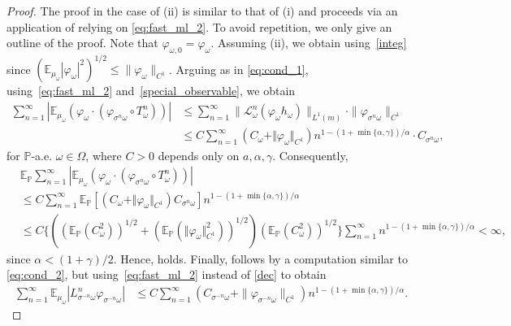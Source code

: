 \documentclass[12pt,reqno,a4paper]{article}
\newcommand\bP{{\mathbb P}}
\begin{document}
\begin{proof}
		The proof in the case of (ii) is similar to that of (i) and proceeds via an application of \cite[Theorem 2.3]{K} relying on \eqref{eq:fast_ml_2}. 
		To avoid repetition, we only give an outline of the proof. Note that $\varphi_{\omega, 0}=\varphi_\omega$.
		Assuming (ii), we obtain \cite[(2.7)]{K} using~\eqref{integ} since $(\mathbb E_{\mu_\omega}|\varphi_{\omega}|^2)^{1/2}\le \|\varphi_\omega\|_{C^1}$. Arguing as in \eqref{eq:cond_1}, using~\eqref{eq:fast_ml_2} and~\eqref{special_observable}, we obtain
		\[
		\begin{split}
			\sum_{n=1}^\infty \left |\mathbb E_{\mu_\omega}(\varphi_{\omega} \cdot (\varphi_{\sigma^n \omega}\circ T_\omega^n))\right | 
			&\le \sum_{n=1}^\infty \|\mathcal L_\omega^n (\varphi_{\omega} h_\omega)\|_{L^1(m)} \cdot \|\varphi_{\sigma^n \omega}\|_{C^1} \\
			&\le C \sum_{n=1}^\infty ( C_\omega + \Vert \varphi_\omega \Vert_{C^1}  ) n^{ 1 - (1 +  \min\{\alpha, \gamma \} )/\alpha}
			\cdot C_{\sigma^n \omega},
		\end{split}
		\]
		for $\bP$-a.e. $\omega \in \Omega$, where $C > 0$ 
		depends only on $a, \alpha, \gamma$. Consequently,
		\[
		\begin{split}
			&\mathbb E_{\mathbb P}\sum_{n=1}^\infty \left |\mathbb E_{\mu_\omega}(\varphi_{\omega} \cdot (\varphi_{\sigma^n \omega}\circ T_\omega^n))\right | \\
			&\le 
			C
			\sum_{n=1}^\infty 
			\mathbb E_{\mathbb P} [ ( C_\omega + \Vert \varphi_\omega \Vert_{C^1}  )   C_{\sigma^n \omega} ]
			 n^{ 1 - (1 +  \min\{\alpha, \gamma \} )/\alpha}  \\
			&\le 
			C\biggl\{  (  ( \mathbb E_{\mathbb P} ( C_{ \omega}^2 ))^{1/2}  
			+  ( \mathbb E_{\mathbb P} (  \Vert \varphi_\omega \Vert_{C^1}^2 ) )^{1/2}  ) ( \mathbb E_{\mathbb P} ( C_{ \omega}^2 ))^{1/2}  \biggr\} 
			\sum_{n=1}^\infty  n^{ 1 - (1 +  \min\{\alpha, \gamma \} )/\alpha} < \infty,
		\end{split}
		\]
		since $\alpha < (1 + \gamma) / 2$. Hence, \cite[Theorem 2.3 (i)]{K} holds.
		Finally, \cite[Theorem 2.3 (ii')]{K} follows by a computation similar to \eqref{eq:cond_2}, but using~\eqref{eq:fast_ml_2} instead of \eqref{dec} to obtain
		\[
		\begin{split}
			\sum_{n=1}^\infty \mathbb E_{\mu_\omega } |L_{\sigma^{-n}\omega}^n \varphi_{\sigma^{-n}\omega}| 
			&\le C  \sum_{n=1}^\infty
			( C_{ \sigma^{-n}  \omega }+ \|\varphi_{\sigma^{-n}\omega}\|_{C^1} ) 
			 n^{ 1 - (1 +  \min\{\alpha,\gamma\} )/\alpha}.
		\end{split}
		\]
	\end{proof}
	
\end{document}
